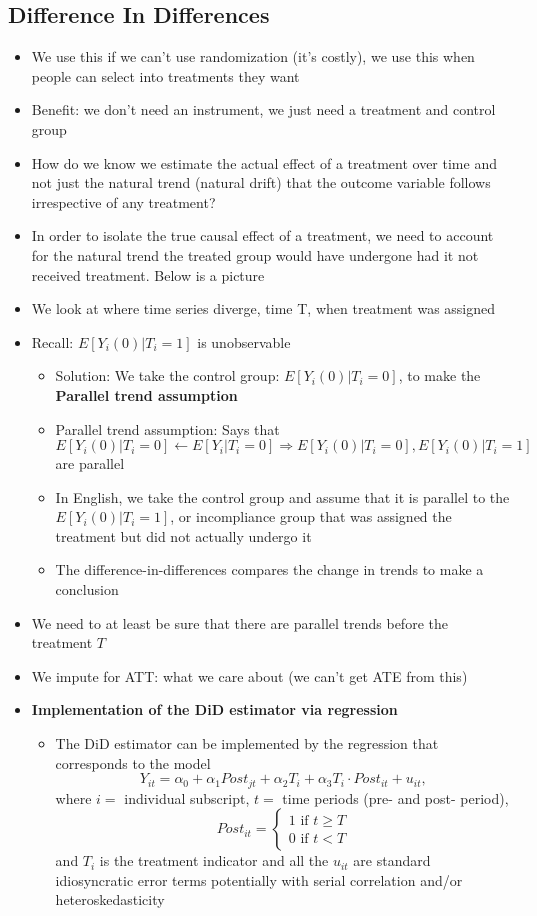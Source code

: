 \documentclass[10pt, oneside]{article}
\begin{document}
\subsection{Difference In Differences}
\begin{itemize}
    \item We use this if we can't use randomization (it's costly), we use this when people can select into treatments they want
    \item Benefit: we don't need an instrument, we just need a treatment and control group
    \item How do we know we estimate the actual effect of a treatment over time and not just the natural trend (natural drift) that the outcome variable follows irrespective of any treatment?
    \item In order to isolate the true causal effect of a treatment, we need to account for the natural trend the treated group would have undergone had it not received treatment. Below is a picture
    \item We look at where time series diverge, time T, when treatment was assigned
    \item Recall: $E[Y_i (0) | T_i = 1]$ is unobservable
    \begin{itemize}
        \item Solution: We take the control group: $E[Y_i (0) | T_i = 0]$, to make the \textbf{Parallel trend assumption}
        \item Parallel trend assumption: Says that $E[Y_i(0) | T_i = 0] \leftarrow E[Y_i | T_i = 0] \Rightarrow E[Y_i (0)|T_i = 0], E[Y_i(0)|T_i = 1]$ are parallel
        \item In English, we take the control group and assume that it is parallel to the $E[Y_i (0) |T_i = 1]$, or incompliance group that was assigned the treatment but did not actually undergo it
        \item The difference-in-differences compares the change in trends to make a conclusion
    \end{itemize}
    \item We need to at least be sure that there are parallel trends before the treatment $T$
    \item We impute for ATT: what we care about (we can't get ATE from this)
    \item \textbf{Implementation of the DiD estimator via regression}
    \begin{itemize}
        \item The DiD estimator can be implemented by the regression that corresponds to the model \[Y_{it} = \alpha_0 + \alpha_1 Post_{jt} + \alpha_2 T_i + \alpha_3 T_i \cdot Post_{it} + u_{it},\]where $i=$ individual subscript, $t=$ time periods (pre- and post- period),\[Post_{it} = \begin{cases}
            1\text{ if }t\geq T\\0\text{ if }t < T
        \end{cases}\]and $T_i$ is the treatment indicator and all the $u_{it}$ are standard idiosyncratic error terms potentially with serial correlation and/or heteroskedasticity
    \end{itemize}
\end{itemize}
\end{document}
